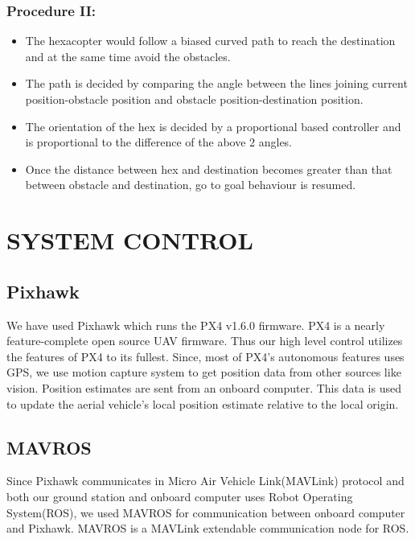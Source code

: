 \documentclass[12pt]{article}
\begin{document}
        \subsubsection*{Procedure II:}
            \begin{itemize}
                \item The hexacopter would follow a biased curved path to reach the destination and at the same time avoid the obstacles.
                \item The path is decided by comparing the angle between the lines joining current position-obstacle position and obstacle position-destination position.
                \item The orientation of the hex is decided by a proportional based controller and is proportional to the difference of the above 2 angles.
                \item Once the distance between hex and destination becomes greater than that between obstacle and destination, go to goal behaviour is resumed.
            \end{itemize}

\section{SYSTEM CONTROL}
\subsection{Pixhawk}
    We have used Pixhawk which runs the PX4 v1.6.0 firmware. PX4 is a nearly feature-complete open source UAV firmware. Thus our high level control utilizes the features of PX4 to its fullest. Since, most of PX4’s autonomous features uses GPS, we use motion capture system to get position data from other sources like vision. Position estimates are sent from an onboard computer. This data is used to update the aerial vehicle's local position estimate relative to the local origin.  
\subsection{MAVROS}
    Since Pixhawk communicates in Micro Air Vehicle Link(MAVLink) protocol and both our ground station and onboard computer uses Robot Operating System(ROS), we used MAVROS for communication between onboard computer and Pixhawk. MAVROS is a MAVLink extendable communication node for ROS.
\end{document}
